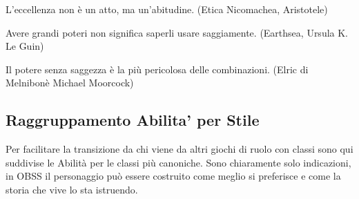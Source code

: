 \bigskip

\begin{enfasi}

	L'eccellenza non è un atto, ma un'abitudine. (Etica Nicomachea, Aristotele)

	\medskip

	Avere grandi poteri non significa saperli usare saggiamente. (Earthsea, Ursula K. Le Guin)

	\medskip

	Il potere senza saggezza è la più pericolosa delle combinazioni. (Elric di Melnibonè Michael Moorcock)

\end{enfasi}


\pagebreak

\subsection{Raggruppamento Abilita' per Stile}

Per facilitare la transizione da chi viene da altri giochi di ruolo con classi sono qui suddivise le Abilità per le classi più canoniche. Sono chiaramente solo indicazioni, in OBSS il personaggio può essere costruito come meglio si preferisce e come la storia che vive lo sta istruendo.

